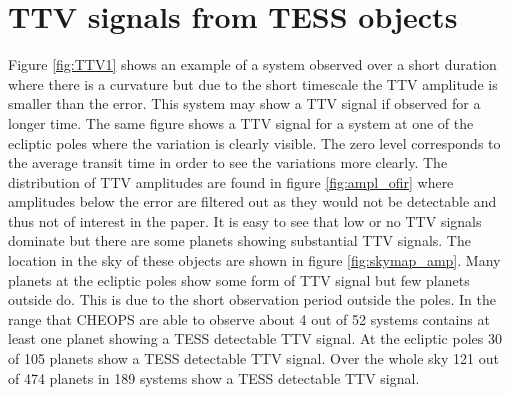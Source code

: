 \documentclass[12pt]{report}
\begin{document}
\section{TTV signals from TESS objects}
	Figure \ref{fig:TTV1} shows an example of a system observed over a short duration where there is a curvature but due to the short timescale the TTV amplitude is smaller than the error. This system may show a TTV signal if observed for a longer time. The same figure shows a TTV signal for a system at one of the ecliptic poles where the variation is clearly visible. The zero level corresponds to the average transit time in order to see the variations more clearly. The distribution of TTV amplitudes are found in figure \ref{fig:ampl_ofir} where amplitudes below the error are filtered out as they would not be detectable and thus not of interest in the paper. It is easy to see that low or no TTV signals dominate but there are some planets showing substantial TTV signals. The location in the sky of these objects are shown in figure \ref{fig:skymap_amp}. Many planets at the ecliptic poles show some form of TTV signal but few planets outside do. This is due to the short observation period outside the poles. In the range that CHEOPS are able to observe about 4 out of 52 systems contains at least one planet showing a TESS detectable TTV signal. At the ecliptic poles 30 of 105 planets show a TESS detectable TTV signal. Over the whole sky 121 out of 474 planets in 189 systems show a TESS detectable TTV signal. 
	
\end{document}
